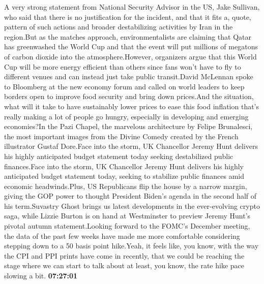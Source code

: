 \documentclass{article}%
\begin{document}
A very strong statement from National Security Advisor in the US, Jake Sullivan, who said that there is no justification for the incident, and that it fits a, quote, pattern of such actions and broader destabilizing activities by Iran in the region.But as the matches approach, environmentalists are claiming that Qatar has greenwashed the World Cup and that the event will put millions of megatons of carbon dioxide into the atmosphere.However, organizers argue that this World Cup will be more energy efficient than others since fans won't have to fly to different venues and can instead just take public transit.David McLennan spoke to Bloomberg at the new economy forum and called on world leaders to keep borders open to improve food security and bring down prices.And the situation, what will it take to have sustainably lower prices to ease this food inflation that's really making a lot of people go hungry, especially in developing and emerging economies?In the Pazi Chapel, the marvelous architecture by Felipe Brunalesci, the most important images from the Divine Comedy created by the French illustrator Gustaf Dore.Face into the storm, UK Chancellor Jeremy Hunt delivers his highly anticipated budget statement today seeking destabilized public finances.Face into the storm, UK Chancellor Jeremy Hunt delivers his highly anticipated budget statement today, seeking to stabilize public finances amid economic headwinds.Plus, US Republicans flip the house by a narrow margin, giving the GOP power to thought President Biden's agenda in the second half of his term.Suvastry Ghost brings us latest developments in the ever{-}evolving crypto saga, while Lizzie Burton is on hand at Westminster to preview Jeremy Hunt's pivotal autumn statement.Looking forward to the FOMC's December meeting, the data of the past few weeks have made me more comfortable considering stepping down to a 50 basis point hike.Yeah, it feels like, you know, with the way the CPI and PPI prints have come in recently, that we could be reaching the stage where we can start to talk about at least, you know, the rate hike pace slowing a bit.%
\textbf{07:27:01}%
\newline%
\end{document}
